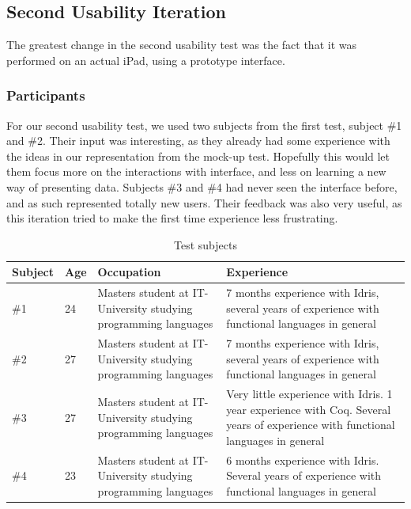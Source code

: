 \subsection{Second Usability Iteration}
\label{sec:SecondUsabilityTest}
The greatest change in the second usability test was the fact that it was
performed on an actual iPad, using a prototype interface. 

\subsubsection{Participants}
For our second usability test, we used two subjects from the first test,
subject \#1 and \#2. Their input was interesting, as they already had some
experience with the ideas in our representation from the mock-up test.
Hopefully this would let them focus more on the interactions with interface,
and less on learning a new way of presenting data. Subjects \#3 and \#4 had
never seen the interface before, and as such represented totally new users.
Their feedback was also very useful, as this iteration tried to make the first
time experience less frustrating.

\begin{table}[h]
\centering
\begin{tabular}{| l | l | p{5cm} | p{5cm} |}
\hline
Subject & Age & Occupation & Experience \\ \hline
\#1 & 24 & Masters student at IT-University studying programming languages & 7 months experience with Idris, several years of experience with functional languages in general \\ \hline
\#2 & 27 & Masters student at IT-University studying programming languages & 7 months experience with Idris, several years of experience with functional languages in general \\ \hline
\#3 & 27 & Masters student at IT-University studying programming languages & Very little experience with Idris. 1 year experience with Coq. Several years of experience with functional languages in general \\ \hline
\#4 & 23 & Masters student at IT-University studying programming languages & 6 months experience with Idris. Several years of experience with functional languages in general \\ \hline
\end{tabular}
\caption {Test subjects}
\label{table:second_test_subjects}
\end{table}

